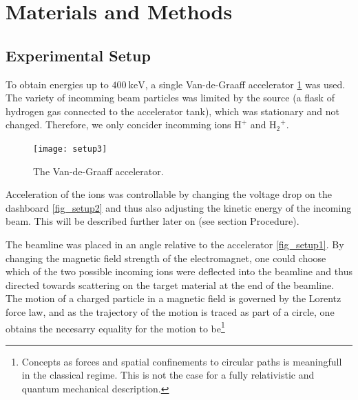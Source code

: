 \section{Materials and Methods}
\subsection{Experimental Setup}
To obtain energies up to $\SI{400}{\kilo\electronvolt}$, a single
Van-de-Graaff accelerator \cref{fig_setup3} was used. The variety of incomming
beam particles was limited by the source (a flask of hydrogen gas connected to
the accelerator tank), which was stationary and not changed. Therefore, we only
concider incomming ions $\mathrm{H^+}$ and $\mathrm{{H_2}^{+}}$. 
%
\begin{figure}[t]
    \centering
    \texttt{[image: setup3]}
    \caption{The Van-de-Graaff accelerator.}
    \label{fig_setup3}
\end{figure}
%
Acceleration of the ions was controllable by changing the voltage drop on the
dashboard \cref{fig_setup2} and thus also adjusting the kinetic energy of the
incoming beam. This will be described further later on (see section Procedure).

The beamline was placed in an angle relative to the accelerator
\cref{fig_setup1}. By changing the magnetic field strength of the
electromagnet, one could choose which of the two possible incoming ions were
deflected into the beamline and thus directed towards scattering on the target material at the end of the beamline. 
The motion of a charged particle in a magnetic field is governed by the Lorentz
force law, and as the trajectory of the motion is traced as part of a circle,
one obtains the necesarry equality for the motion to be\footnote{Concepts as
forces and spatial confinements to circular paths is meaningfull in the
classical regime. This is not the case for a fully relativistic and quantum
mechanical description.}

